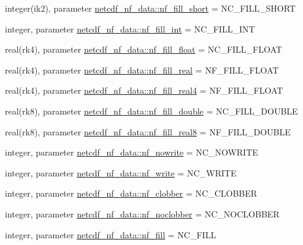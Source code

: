 \begin{DoxyCompactItemize}
\item 
integer(ik2), parameter \hyperlink{namespacenetcdf__nf__data_a0f1e22d1d4d770f9f38bdbdb033b141a}{netcdf\+\_\+nf\+\_\+data\+::nf\+\_\+fill\+\_\+short} = N\+C\+\_\+\+F\+I\+L\+L\+\_\+\+S\+H\+O\+RT
\item 
integer, parameter \hyperlink{namespacenetcdf__nf__data_ab1f2a07e7f49cc04285b82c9171156a3}{netcdf\+\_\+nf\+\_\+data\+::nf\+\_\+fill\+\_\+int} = N\+C\+\_\+\+F\+I\+L\+L\+\_\+\+I\+NT
\item 
real(rk4), parameter \hyperlink{namespacenetcdf__nf__data_a45481fe25da439752c00577a5621f3af}{netcdf\+\_\+nf\+\_\+data\+::nf\+\_\+fill\+\_\+float} = N\+C\+\_\+\+F\+I\+L\+L\+\_\+\+F\+L\+O\+AT
\item 
real(rk4), parameter \hyperlink{namespacenetcdf__nf__data_a216255093ca5242a39b018756c753fc8}{netcdf\+\_\+nf\+\_\+data\+::nf\+\_\+fill\+\_\+real} = N\+F\+\_\+\+F\+I\+L\+L\+\_\+\+F\+L\+O\+AT
\item 
real(rk4), parameter \hyperlink{namespacenetcdf__nf__data_ab3b3657f41dac420f28e0801a42050e2}{netcdf\+\_\+nf\+\_\+data\+::nf\+\_\+fill\+\_\+real4} = N\+F\+\_\+\+F\+I\+L\+L\+\_\+\+F\+L\+O\+AT
\item 
real(rk8), parameter \hyperlink{namespacenetcdf__nf__data_a80163a1522a8aefe8dad549a90ca70f3}{netcdf\+\_\+nf\+\_\+data\+::nf\+\_\+fill\+\_\+double} = N\+C\+\_\+\+F\+I\+L\+L\+\_\+\+D\+O\+U\+B\+LE
\item 
real(rk8), parameter \hyperlink{namespacenetcdf__nf__data_a646a4d0f62d4fd9e6003de6054e2dd0e}{netcdf\+\_\+nf\+\_\+data\+::nf\+\_\+fill\+\_\+real8} = N\+F\+\_\+\+F\+I\+L\+L\+\_\+\+D\+O\+U\+B\+LE
\item 
integer, parameter \hyperlink{namespacenetcdf__nf__data_a9ce94f6db387c6d8dbb4b42b50c99b41}{netcdf\+\_\+nf\+\_\+data\+::nf\+\_\+nowrite} = N\+C\+\_\+\+N\+O\+W\+R\+I\+TE
\item 
integer, parameter \hyperlink{namespacenetcdf__nf__data_aaf3fef826de5a81142ab319ef0ed0539}{netcdf\+\_\+nf\+\_\+data\+::nf\+\_\+write} = N\+C\+\_\+\+W\+R\+I\+TE
\item 
integer, parameter \hyperlink{namespacenetcdf__nf__data_abfbd39871ccb74577973ce9332bf3a73}{netcdf\+\_\+nf\+\_\+data\+::nf\+\_\+clobber} = N\+C\+\_\+\+C\+L\+O\+B\+B\+ER
\item 
integer, parameter \hyperlink{namespacenetcdf__nf__data_a120c58276f557cff3cca645c7bd34e07}{netcdf\+\_\+nf\+\_\+data\+::nf\+\_\+noclobber} = N\+C\+\_\+\+N\+O\+C\+L\+O\+B\+B\+ER
\item 
integer, parameter \hyperlink{namespacenetcdf__nf__data_a45554206e759ae606aa467504278f3bc}{netcdf\+\_\+nf\+\_\+data\+::nf\+\_\+fill} = N\+C\+\_\+\+F\+I\+LL

\end{DoxyCompactItemize}
